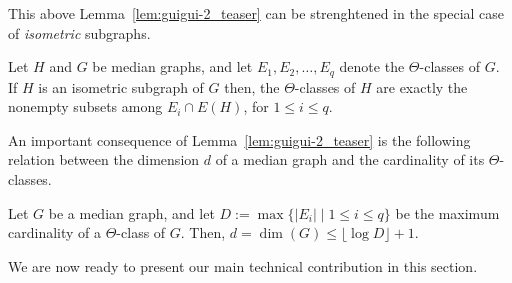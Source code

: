 \documentclass[a4paper,UKenglish,numberwithinsect,cleveref, autoref]{lipics-v2021}
\begin{document}
This above Lemma~\ref{lem:guigui-2_teaser} can be strenghtened in the special case of {\em isometric} subgraphs.

\begin{lemma}[\ref{lem:guigui-2bis}]\label{lem:guigui-2bis_teaser}
Let $H$ and $G$ be median graphs, and let $E_1,E_2,\ldots,E_q$ denote the $\Theta$-classes of $G$.
If $H$ is an isometric subgraph of $G$ then, the $\Theta$-classes of $H$ are exactly the nonempty subsets among $E_i \cap E(H)$, for $1 \leq i \leq q$.
\end{lemma}

An important consequence of Lemma~\ref{lem:guigui-2_teaser} is the following relation between the dimension $d$ of a median graph and the cardinality of its $\Theta$-classes.

\begin{lemma}[\ref{lem:guigui-3}]\label{lem:guigui-3_teaser}
Let $G$ be a median graph, and let $D := \max\{ |E_i| \mid 1 \leq i \leq q\}$ be the maximum cardinality of a $\Theta$-class of $G$. Then, $d = \dim(G) \leq \lfloor\log{D}\rfloor + 1$.
\end{lemma}

We are now ready to present our main technical contribution in this section.
\end{document}
